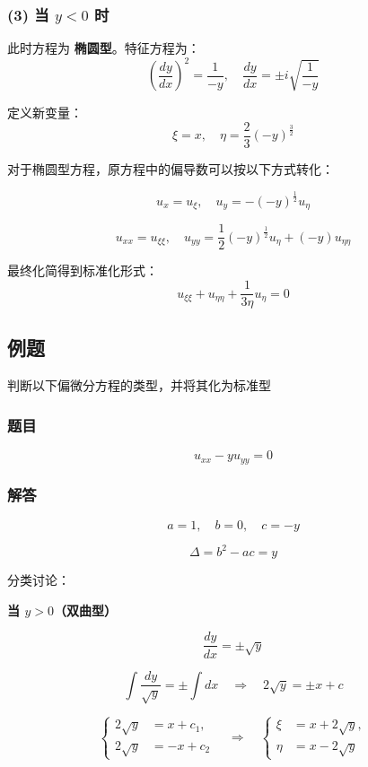\subsubsection*{(3) 当 \( y < 0 \) 时}
此时方程为 \textbf{椭圆型}。特征方程为：
\[
\left( \frac{dy}{dx} \right)^2 = \frac{1}{-y}, \quad \frac{dy}{dx} = \pm i \sqrt{\frac{1}{-y}}
\]

定义新变量：
\[
\xi = x, \quad \eta = \frac{2}{3} (-y)^{\frac{3}{2}}
\]

对于椭圆型方程，原方程中的偏导数可以按以下方式转化：

\[
u_x = u_{\xi} , \quad u_y = - (-y)^{\frac{1}{2}} u_{\eta}
\]

\[
u_{xx} = u_{\xi \xi} , \quad u_{yy} = \frac{1}{2}(-y)^{\frac{1}{2}} u_{\eta} + (-y)u_{\eta \eta}
\]

最终化简得到标准化形式：
\[
u_{\xi \xi} + u_{\eta \eta} + \frac{1}{3\eta}u_{\eta} = 0
\]


\subsection{例题}
判断以下偏微分方程的类型，并将其化为标准型

\subsubsection*{题目}
\[
u_{xx} - y u_{yy} = 0
\]

\subsubsection*{解答}

\[
a = 1, \quad b = 0, \quad c = -y
\]

\[
\Delta = b^2 - ac = y
\]

分类讨论：

\textbf{当 $y > 0$（双曲型）}

\[
\frac{dy}{dx} = \pm \sqrt{y}
\]

\[
\int \frac{dy}{\sqrt{y}} = \pm \int dx \quad \Longrightarrow \quad 2\sqrt{y} = \pm x + c
\]

\[
\left\{
\begin{aligned}
2\sqrt{y} &= x + c_1, \\
2\sqrt{y} &= -x + c_2
\end{aligned}
\right.
\quad \Longrightarrow \quad
\left\{
\begin{aligned}
\xi &= x + 2\sqrt{y}, \\
\eta &= x - 2\sqrt{y}
\end{aligned}
\right.
\]

